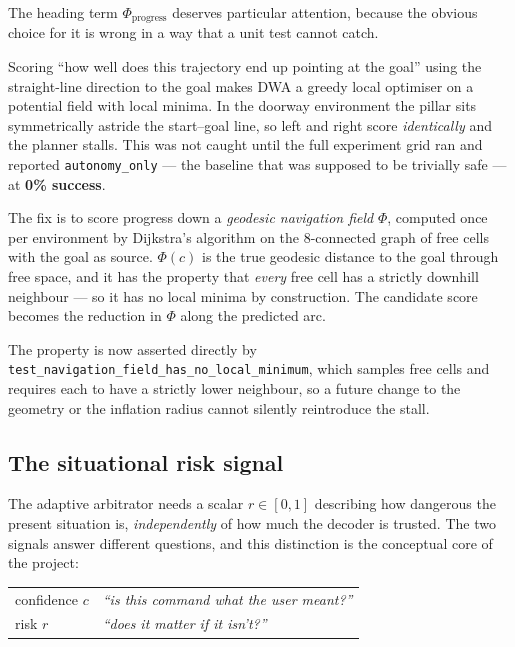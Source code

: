\documentclass[11pt,a4paper]{article}
\newcommand{\vauto}{\texttt{autonomy\_only}}
\theoremstyle{plain}
\theoremstyle{definition}
\begin{document}
The heading term $\Phi_{\text{progress}}$ deserves particular attention,
because the obvious choice for it is wrong in a way that a unit test
cannot catch.

Scoring ``how well does this trajectory end up pointing at the goal''
using the straight-line direction to the goal makes DWA a greedy local
optimiser on a potential field with local minima. In the doorway
environment the pillar sits symmetrically astride the start--goal line,
so left and right score \emph{identically} and the planner stalls. This
was not caught until the full experiment grid ran and reported
\vauto{} --- the baseline that was supposed to be trivially safe ---
at \textbf{0\% success}.

The fix is to score progress down a \emph{geodesic navigation field}
$\Phi$, computed once per environment by Dijkstra's algorithm on the
8-connected graph of free cells with the goal as source. $\Phi(c)$ is
the true geodesic distance to the goal through free space, and it has
the property that \emph{every} free cell has a strictly downhill
neighbour --- so it has no local minima by construction. The candidate
score becomes the reduction in $\Phi$ along the predicted arc.

The property is now asserted directly by
\texttt{test\_navigation\_field\_has\_no\_local\_minimum}, which samples
free cells and requires each to have a strictly lower neighbour, so a
future change to the geometry or the inflation radius cannot silently
reintroduce the stall.

\subsection{The situational risk signal}
\label{sec:risk}

The adaptive arbitrator needs a scalar $r \in [0,1]$ describing how
dangerous the present situation is, \emph{independently} of how much the
decoder is trusted. The two signals answer different questions, and this
distinction is the conceptual core of the project:

\begin{center}
\begin{tabular}{@{}ll@{}}
\toprule
confidence $c$ & \emph{``is this command what the user meant?''} \\
risk $r$       & \emph{``does it matter if it isn't?''} \\
\bottomrule
\end{tabular}
\end{center}
\end{document}
